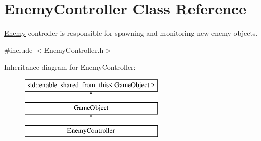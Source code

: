 \hypertarget{class_enemy_controller}{}\section{Enemy\+Controller Class Reference}
\label{class_enemy_controller}


\hyperlink{class_enemy}{Enemy} controller is responsible for spawning and monitoring new enemy objects.  




{\ttfamily \#include $<$Enemy\+Controller.\+h$>$}

Inheritance diagram for Enemy\+Controller\+:\begin{figure}[H]
\begin{center}
\leavevmode
\includegraphics[height=3.000000cm]{dc/d01/class_enemy_controller}
\end{center}
\end{figure}
